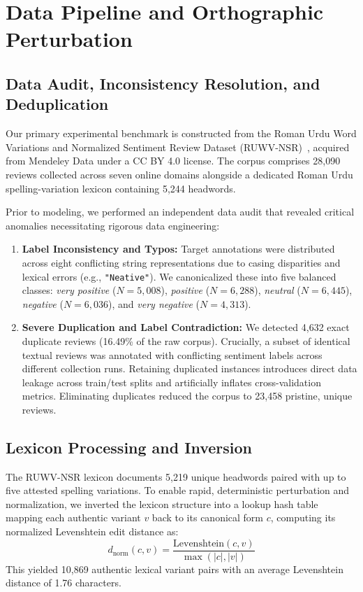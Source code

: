 \section{Data Pipeline and Orthographic Perturbation}
\label{sec:data_pipeline}

\subsection{Data Audit, Inconsistency Resolution, and Deduplication}
Our primary experimental benchmark is constructed from the Roman Urdu Word Variations and Normalized Sentiment Review Dataset (RUWV-NSR)~\cite{ahmed2024ruwvnsr}, acquired from Mendeley Data under a CC BY 4.0 license. The corpus comprises 28,090 reviews collected across seven online domains alongside a dedicated Roman Urdu spelling-variation lexicon containing 5,244 headwords.

Prior to modeling, we performed an independent data audit that revealed critical anomalies necessitating rigorous data engineering:
\begin{enumerate}
    \item \textbf{Label Inconsistency and Typos:} Target annotations were distributed across eight conflicting string representations due to casing disparities and lexical errors (e.g., \texttt{"Neative"}). We canonicalized these into five balanced classes: \textit{very positive} ($N=5,008$), \textit{positive} ($N=6,288$), \textit{neutral} ($N=6,445$), \textit{negative} ($N=6,036$), and \textit{very negative} ($N=4,313$).
    \item \textbf{Severe Duplication and Label Contradiction:} We detected 4,632 exact duplicate reviews (16.49\% of the raw corpus). Crucially, a subset of identical textual reviews was annotated with conflicting sentiment labels across different collection runs. Retaining duplicated instances introduces direct data leakage across train/test splits and artificially inflates cross-validation metrics. Eliminating duplicates reduced the corpus to 23,458 pristine, unique reviews.
\end{enumerate}

\subsection{Lexicon Processing and Inversion}
The RUWV-NSR lexicon documents 5,219 unique headwords paired with up to five attested spelling variations. To enable rapid, deterministic perturbation and normalization, we inverted the lexicon structure into a lookup hash table mapping each authentic variant $v$ back to its canonical form $c$, computing its normalized Levenshtein edit distance as:
\begin{equation}
    d_{\text{norm}}(c, v) = \frac{\text{Levenshtein}(c, v)}{\max(|c|, |v|)}
\end{equation}
This yielded 10,869 authentic lexical variant pairs with an average Levenshtein distance of 1.76 characters.

